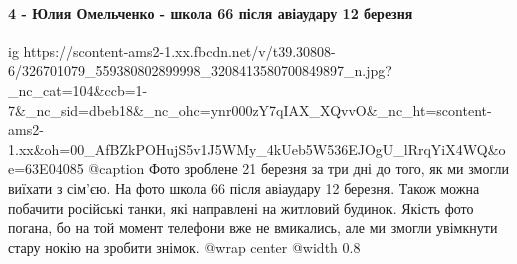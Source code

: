  
 
 
 
 

\paragraph{4 - Юлия Омельченко - школа 66 після авіаудару 12 березня}


\ifcmt
  ig https://scontent-ams2-1.xx.fbcdn.net/v/t39.30808-6/326701079_559380802899998_3208413580700849897_n.jpg?_nc_cat=104&ccb=1-7&_nc_sid=dbeb18&_nc_ohc=ynr000zY7qIAX_XQvvO&_nc_ht=scontent-ams2-1.xx&oh=00_AfBZkPOHujS5v1J5WMy_4kUeb5W536EJOgU_lRrqYiX4WQ&oe=63E04085
  @caption Фото зроблене 21 березня за три дні до того, як ми змогли виїхати з сім'єю. На фото школа 66 після авіаудару 12 березня. Також можна побачити російські танки, які направлені на житловий будинок. Якість фото погана, бо на той момент телефони вже не вмикались, але ми змогли увімкнути стару нокію на зробити знімок.
  @wrap center
  @width 0.8
\fi

